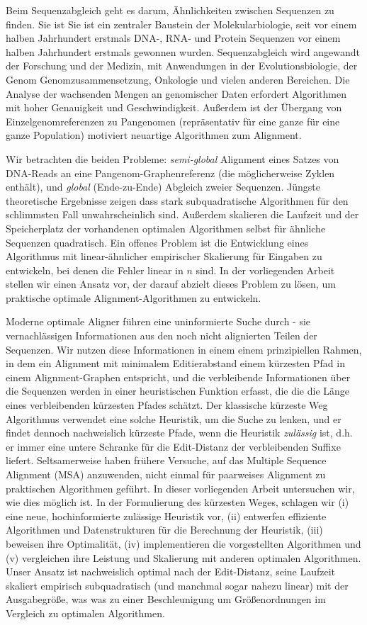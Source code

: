 Beim Sequenzabgleich geht es darum, Ähnlichkeiten zwischen Sequenzen zu finden. Sie ist
Sie ist ein zentraler Baustein der Molekularbiologie, seit vor einem halben Jahrhundert erstmals DNA-, RNA- und Protein
Sequenzen vor einem halben Jahrhundert erstmals gewonnen wurden. Sequenzabgleich wird angewandt
der Forschung und der Medizin, mit Anwendungen in der Evolutionsbiologie, der Genom
Genomzusammensetzung, Onkologie und vielen anderen Bereichen. Die Analyse der wachsenden Mengen an
genomischer Daten erfordert Algorithmen mit hoher Genauigkeit und Geschwindigkeit. Außerdem ist der
Übergang von Einzelgenomreferenzen zu Pangenomen (repräsentativ für eine ganze
für eine ganze Population) motiviert neuartige Algorithmen zum Alignment.

Wir betrachten die beiden Probleme: \emph{semi-global} Alignment eines Satzes von DNA-Reads
an eine Pangenom-Graphenreferenz (die möglicherweise Zyklen enthält), und \emph{global}
(Ende-zu-Ende) Abgleich zweier Sequenzen. Jüngste theoretische Ergebnisse zeigen
dass stark subquadratische Algorithmen für den schlimmsten Fall unwahrscheinlich sind.
Außerdem skalieren die Laufzeit und der Speicherplatz der vorhandenen optimalen Algorithmen
selbst für ähnliche Sequenzen quadratisch. Ein offenes Problem ist die Entwicklung eines
Algorithmus mit linear-ähnlicher empirischer Skalierung für Eingaben zu entwickeln, bei denen die Fehler
linear in $n$ sind. In der vorliegenden Arbeit stellen wir einen Ansatz vor, der darauf abzielt
dieses Problem zu lösen, um praktische optimale Alignment-Algorithmen zu entwickeln.

Moderne optimale Aligner führen eine uninformierte Suche durch - sie vernachlässigen Informationen
aus den noch nicht alignierten Teilen der Sequenzen. Wir nutzen diese Informationen in einem
einem prinzipiellen Rahmen, in dem ein Alignment mit minimalem Editierabstand
einem kürzesten Pfad in einem Alignment-Graphen entspricht, und die verbleibende
Informationen über die Sequenzen werden in einer heuristischen Funktion erfasst, die
die die Länge eines verbleibenden kürzesten Pfades schätzt. Der klassische kürzeste Weg
Algorithmus \A verwendet eine solche Heuristik, um die Suche zu lenken, und er findet dennoch
nachweislich kürzeste Pfade, wenn die Heuristik \emph{zulässig} ist, d.h. er
immer eine untere Schranke für die Edit-Distanz der verbleibenden Suffixe liefert.
Seltsamerweise haben frühere Versuche, \A auf das Multiple Sequence Alignment (MSA) anzuwenden,
nicht einmal für paarweises Alignment zu praktischen Algorithmen geführt. In dieser
vorliegenden Arbeit untersuchen wir, wie dies möglich ist. In der Formulierung des kürzesten Weges,
schlagen wir (i) eine neue, hochinformierte zulässige Heuristik vor, (ii) entwerfen
effiziente Algorithmen und Datenstrukturen für die Berechnung der Heuristik, (iii)
beweisen ihre Optimalität, (iv) implementieren die vorgestellten Algorithmen und (v) vergleichen
ihre Leistung und Skalierung mit anderen optimalen Algorithmen. Unser Ansatz ist
nachweislich optimal nach der Edit-Distanz, seine Laufzeit skaliert empirisch
subquadratisch (und manchmal sogar nahezu linear) mit der Ausgabegröße, was
was zu einer Beschleunigung um Größenordnungen im Vergleich zu
optimalen Algorithmen.

